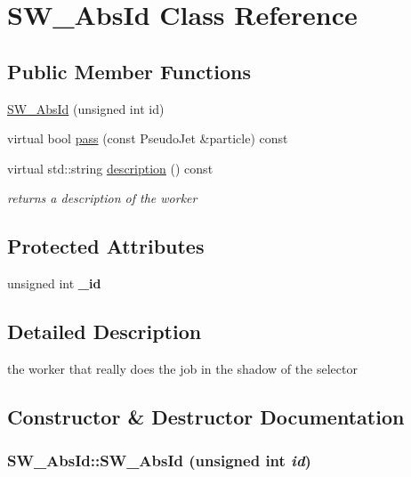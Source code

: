 \hypertarget{classSW__AbsId}{
\section{SW\_\-Abs\-Id Class Reference}
\label{classSW__AbsId}
}
\subsection*{Public Member Functions}
\begin{CompactItemize}
\item 
\hyperlink{classSW__AbsId_b3a21665aa16f81fa7a1020558917bfe}{SW\_\-Abs\-Id} (unsigned int id)
\item 
virtual bool \hyperlink{classSW__AbsId_07215949f2ea5311ce909443e5be8ee5}{pass} (const Pseudo\-Jet \&particle) const 
\item 
\hypertarget{classSW__AbsId_66935e7a91017bd2e4cf7a5364279b07}{
virtual std::string \hyperlink{classSW__AbsId_66935e7a91017bd2e4cf7a5364279b07}{description} () const }
\label{classSW__AbsId_66935e7a91017bd2e4cf7a5364279b07}

\begin{CompactList}\small\item\em returns a description of the worker \item\end{CompactList}\end{CompactItemize}
\subsection*{Protected Attributes}
\begin{CompactItemize}
\item 
\hypertarget{classSW__AbsId_44b01d940f71b7893945f536acdcf8ae}{
unsigned int \textbf{\_\-id}}
\label{classSW__AbsId_44b01d940f71b7893945f536acdcf8ae}

\end{CompactItemize}


\subsection{Detailed Description}
the worker that really does the job in the shadow of the selector 



\subsection{Constructor \& Destructor Documentation}
\hypertarget{classSW__AbsId_b3a21665aa16f81fa7a1020558917bfe}{
\subsubsection[SW\_\-AbsId]{\setlength{\rightskip}{0pt plus 5cm}SW\_\-Abs\-Id::SW\_\-Abs\-Id (unsigned int {\em id})}}
\label{classSW__AbsId_b3a21665aa16f81fa7a1020558917bfe}


